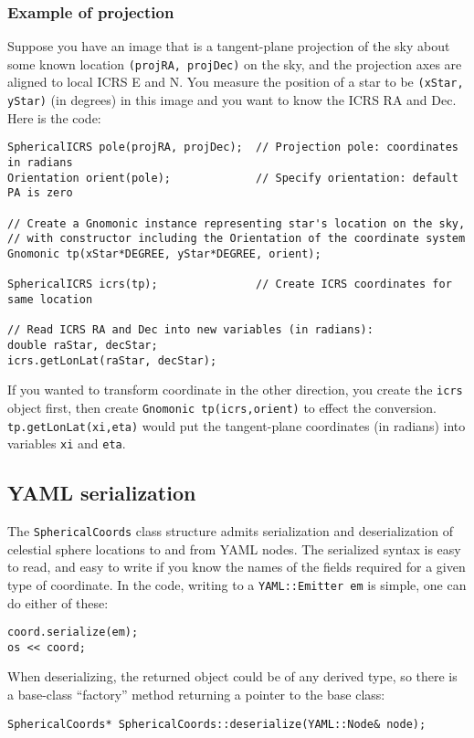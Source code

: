 \documentclass[11pt,preprint,flushrt]{aastex}
\begin{document}
\subsubsection{Example of projection}
Suppose you have an image that is a tangent-plane projection of the sky about some known location {\tt (projRA, projDec)} on the sky, and the projection axes are aligned to local ICRS E and N.  You measure the position of a star to be {\tt (xStar, yStar)} (in degrees) in this image and you want to know the ICRS RA and Dec.  Here is the code:
\begin{verbatim}
SphericalICRS pole(projRA, projDec);  // Projection pole: coordinates in radians
Orientation orient(pole);             // Specify orientation: default PA is zero

// Create a Gnomonic instance representing star's location on the sky,
// with constructor including the Orientation of the coordinate system
Gnomonic tp(xStar*DEGREE, yStar*DEGREE, orient);

SphericalICRS icrs(tp);               // Create ICRS coordinates for same location

// Read ICRS RA and Dec into new variables (in radians):
double raStar, decStar;
icrs.getLonLat(raStar, decStar);
\end{verbatim}
If you wanted to transform coordinate in the other direction, you create the {\tt icrs} object first, then create {\tt Gnomonic tp(icrs,orient)} to effect the conversion.  {\tt tp.getLonLat(xi,eta)} would put the tangent-plane coordinates (in radians) into variables {\tt xi} and {\tt eta}.

\subsection{YAML serialization}
The \texttt{SphericalCoords} class structure admits serialization and deserialization of celestial sphere locations to and from YAML nodes.  The serialized syntax is easy to read, and easy to write if you know the names of the fields required for a given type of coordinate.  In the code, writing to a \texttt{YAML::Emitter em} is simple, one can do either of these:
\begin{verbatim}
coord.serialize(em);
os << coord;
\end{verbatim}

When deserializing, the returned object could be of any derived type, so there is a base-class ``factory'' method returning a pointer to the base class:
\begin{verbatim}
SphericalCoords* SphericalCoords::deserialize(YAML::Node& node);
\end{verbatim}
\end{document}
